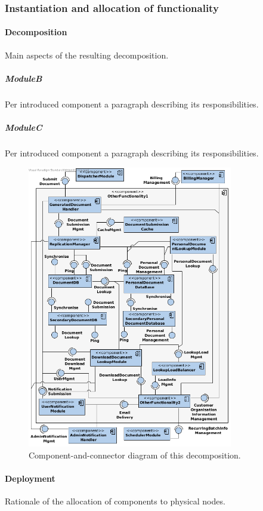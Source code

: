 \documentclass[a4paper,10pt]{article}
\begin{document}
\subsubsection{Instantiation and allocation of functionality}
\paragraph{Decomposition}
Main aspects of the resulting decomposition.

\subparagraph{ModuleB}
Per introduced component a paragraph describing its responsibilities.

\subparagraph{ModuleC}
Per introduced component a paragraph describing its responsibilities.


\begin{figure}[!htp]
    \centering
    \includegraphics[width=0.8\textwidth]{comp_diag_2.png}
    \caption{Component-and-connector diagram of this decomposition.
        }\label{fig:it2-cc_main}
\end{figure}

\paragraph{Deployment}
Rationale of the allocation of components to physical nodes.
\end{document}
